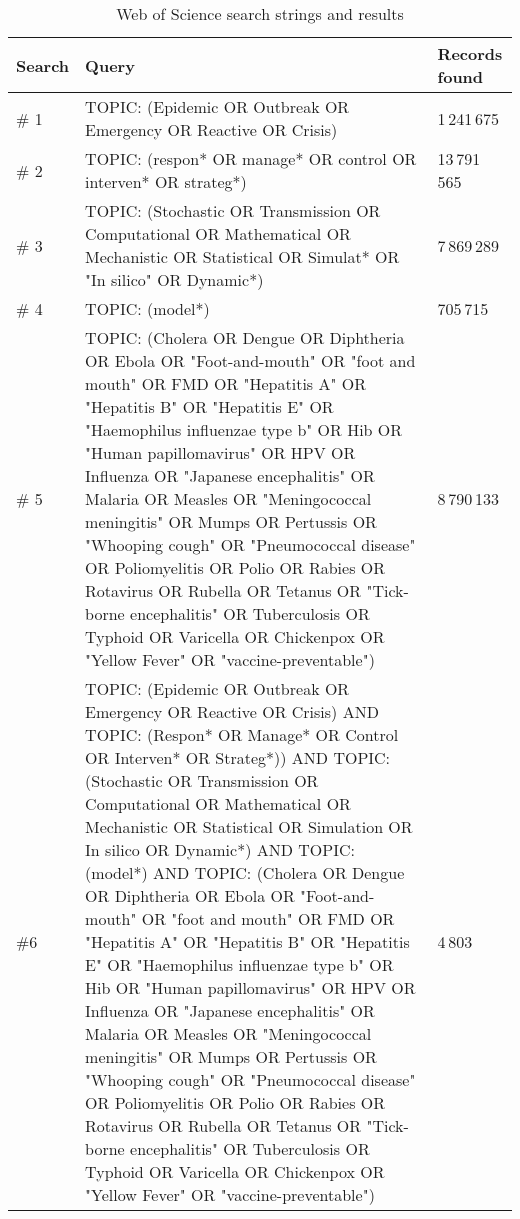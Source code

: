 \documentclass[10pt,a4paper]{article}
\begin{document}
\begin{sidewaysfigure}
	\begin{table}[H]
		\centering
		\caption{Web of Science search strings and results}
		\begin{tabular}{lp{}l}
			\toprule
			\textbf{Search} & \textbf{Query} & \textbf{Records found} \\
			\midrule
			\# 1 & TOPIC: (Epidemic OR Outbreak OR   Emergency OR Reactive OR Crisis) & 1\,241\,675 \\
			\# 2 & TOPIC: (respon* OR  manage*    OR  control  OR    interven*  OR  strateg*) & 13\,791\,565 \\
			\# 3 & TOPIC: (Stochastic OR Transmission   OR Computational OR Mathematical OR Mechanistic OR Statistical OR Simulat* OR    "In silico" OR Dynamic*) & 7\,869\,289 \\
			\# 4 & TOPIC: (model*) & 705\,715 \\
			\# 5 & TOPIC: (Cholera OR Dengue OR Diphtheria   OR Ebola OR "Foot-and-mouth" OR "foot and mouth" OR FMD   OR "Hepatitis A" OR "Hepatitis B" OR "Hepatitis   E" OR "Haemophilus influenzae type b" OR Hib OR "Human   papillomavirus" OR HPV OR Influenza OR "Japanese encephalitis" OR Malaria OR Measles OR "Meningococcal meningitis" OR Mumps OR  Pertussis OR "Whooping cough" OR "Pneumococcal disease"   OR Poliomyelitis OR Polio OR Rabies OR Rotavirus OR Rubella OR Tetanus OR   "Tick-borne encephalitis" OR Tuberculosis OR Typhoid OR Varicella   OR Chickenpox OR "Yellow Fever" OR "vaccine-preventable") & 8\,790\,133 \\
			\#6 & TOPIC: (Epidemic OR Outbreak OR   Emergency OR Reactive OR Crisis) AND TOPIC: (Respon* OR  Manage* OR  Control  OR    Interven*  OR  Strateg*)) AND TOPIC: (Stochastic OR   Transmission OR Computational OR Mathematical OR Mechanistic OR Statistical   OR Simulation OR In silico OR Dynamic*) AND TOPIC: (model*) AND TOPIC:   (Cholera OR Dengue OR Diphtheria OR Ebola OR  "Foot-and-mouth" OR   "foot and mouth" OR FMD OR "Hepatitis A" OR   "Hepatitis B" OR "Hepatitis E" OR "Haemophilus   influenzae type b" OR Hib OR "Human papillomavirus" OR HPV OR   Influenza OR "Japanese encephalitis" OR Malaria OR Measles OR   "Meningococcal meningitis" OR Mumps OR Pertussis OR "Whooping   cough" OR "Pneumococcal disease" OR Poliomyelitis OR Polio OR   Rabies OR Rotavirus OR Rubella OR Tetanus OR "Tick-borne   encephalitis" OR Tuberculosis OR Typhoid OR  Varicella OR Chickenpox OR   "Yellow Fever" OR "vaccine-preventable") & 4\,803 \\
			\bottomrule
		\end{tabular}
	\end{table}
\end{sidewaysfigure}
\end{document}
